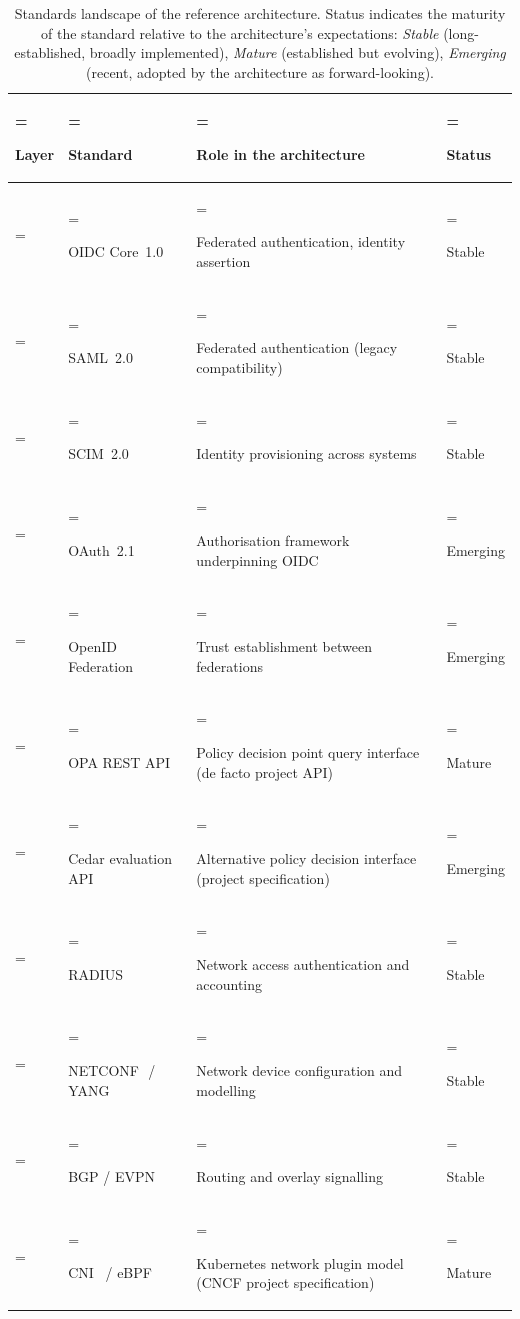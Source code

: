 \begin{table}[H]
\centering\small
\caption{Standards landscape of the reference architecture. Status
indicates the maturity of the standard relative to the architecture's
expectations: \emph{Stable} (long-established, broadly implemented),
\emph{Mature} (established but evolving), \emph{Emerging} (recent,
adopted by the architecture as forward-looking).}
\label{tab:ap-standards}
\begin{tabularx}{\textwidth}{%
  >{\hsize=0.55\hsize\linewidth=\hsize\bfseries\raggedright\arraybackslash}X%
  >{\hsize=0.95\hsize\linewidth=\hsize\raggedright\arraybackslash}X%
  >{\hsize=1.05\hsize\linewidth=\hsize\raggedright\arraybackslash}X%
  >{\hsize=0.45\hsize\linewidth=\hsize\raggedright\arraybackslash}X%
}
\toprule
Layer & Standard & Role in the architecture & Status \\
\midrule
\multirow{5}{*}{Identity}
  & OIDC Core~1.0~\cite{oidc-core-1.0}      & Federated authentication, identity assertion & Stable \\
  & SAML~2.0~\cite{saml-core-2.0}           & Federated authentication (legacy compatibility) & Stable \\
  & SCIM~2.0~\cite{rfc-7643-scim-core,rfc-7644-scim-protocol} & Identity provisioning across systems & Stable \\
  & OAuth~2.1~\cite{oauth-2-1}              & Authorisation framework underpinning OIDC & Emerging \\
  & OpenID Federation  & Trust establishment between federations & Emerging \\
\addlinespace
\multirow{2}{*}{Policy}
  & OPA REST API~\cite{opa-project}         & Policy decision point query interface (de facto project API) & Mature \\
  & Cedar evaluation API~\cite{cedar-project} & Alternative policy decision interface (project specification) & Emerging \\
\addlinespace
\multirow{5}{*}{Network}
  & RADIUS~\cite{rfc-2865-radius,rfc-2866-radius-acct} & Network access authentication and accounting & Stable \\
  & NETCONF~\cite{rfc-6241-netconf}\,/\,YANG~\cite{rfc-7950-yang} & Network device configuration and modelling & Stable \\
  & BGP / EVPN         & Routing and overlay signalling & Stable \\
  & CNI~\cite{cni-spec} / eBPF        & Kubernetes network plugin model (CNCF project specification) & Mature \\

\end{tabularx}
\end{table}
